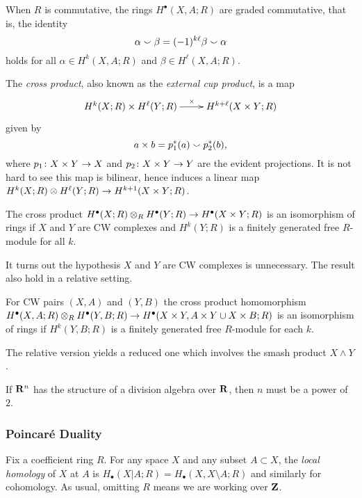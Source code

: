 \begin{theorem}
  When $R$ is commutative, the rings $H^\bullet(X,A;R)$ are graded commutative, that is, the identity
  \[
  \alpha \smallsmile \beta = (-1)^{k\ell} \beta \smallsmile \alpha
  \]
  holds for all $\alpha \in H^k(X,A;R)$ and $\beta \in H^\ell(X,A;R)$.
\end{theorem}

The \emph{cross product}, also known as the \emph{external cup product}, is a map
\[\xymatrix{
  H^k(X;R) \x H^\ell(Y;R) \ar[r]^-\x & H^{k+\ell}(X \x Y; R)
}\]
given by
\[
a \times b = p_1^\ast(a) \smallsmile p_2^\ast(b),
\]
where $p_1 \colon X \times Y \rightarrow X$ and $p_2 \colon X \times Y \rightarrow Y$ are the evident projections. It is not hard to see this map is bilinear, hence induces a linear map $H^k(X;R) \otimes H^\ell(Y;R) \rightarrow H^{k+1}(X \times Y; R)$.

\begin{theorem}
  The cross product $H^\bullet(X;R) \otimes_R H^\bullet(Y;R) \rightarrow H^\bullet(X \times Y;R)$ is an isomorphism of rings if $X$ and $Y$ are CW complexes and $H^k(Y;R)$ is a finitely generated free $R$-module for all $k$.
\end{theorem}

It turns out the hypothesis $X$ and $Y$ are CW complexes is unnecessary. The result also hold in a relative setting.

\begin{theorem}
  For CW pairs $(X,A)$ and $(Y,B)$ the cross product homomorphism $H^\bullet(X,A;R) \otimes_R H^\bullet(Y,B;R) \rightarrow H^\bullet(X \times Y, A \times Y \cup X \times B; R)$ is an isomorphism of rings if $H^k(Y,B;R)$ is a finitely generated free $R$-module for each $k$.
\end{theorem}

The relative version yields a reduced one which involves the smash product $X \wedge Y$.

\begin{theorem}
  If $\mathbf{R}^n$ has the structure of a division algebra over $\mathbf{R}$, then $n$ must be a power of $2$.
\end{theorem}

\subsubsection{Poincar\'e Duality}

Fix a coefficient ring $R$. For any space $X$ and any subset $A \subset X$, the \emph{local homology} of $X$ at $A$ is $H_\bullet(X|A;R) = H_\bullet(X, X \setminus A; R)$ and similarly for cohomology. As usual, omitting $R$ means we are working over $\mathbf{Z}$.

